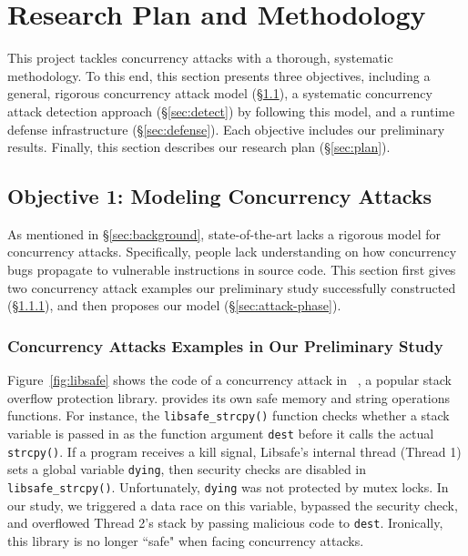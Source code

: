 \vspace{-.15in}\section{Research Plan and Methodology}
\label{sec:rep}\vspace{-.075in}

This \xxx project tackles concurrency attacks with a thorough, systematic 
methodology. To this end, this section presents three objectives, including a 
general, rigorous concurrency attack model (\S\ref{sec:model}), a systematic 
concurrency attack detection approach (\S\ref{sec:detect}) by following this 
model, and a runtime defense infrastructure (\S\ref{sec:defense}). Each 
objective includes our preliminary results. Finally, this section describes our 
research plan (\S\ref{sec:plan}).

\vspace{-.15in}\subsection{Objective 1: Modeling Concurrency Attacks} 
\label{sec:model}\vspace{-.075in}

As mentioned in \S\ref{sec:background}, state-of-the-art lacks a rigorous model 
for concurrency attacks. Specifically, people lack understanding on how 
concurrency bugs propagate to vulnerable instructions in source code. This 
section first gives two concurrency attack examples our preliminary study 
successfully constructed (\S\ref{sec:examples}), and then proposes 
our model (\S\ref{sec:attack-phase}).

\vspace{-.15in}\subsubsection{Concurrency Attacks Examples in Our Preliminary 
Study} 
\label{sec:examples}\vspace{-.075in}

Figure~\ref{fig:libsafe} shows the code of a concurrency attack in 
\libsafe~\cite{libsafe}, a popular stack overflow protection library. \libsafe
provides its own safe memory and string operations functions. For instance, the 
\texttt{libsafe\_strcpy()} function checks whether a stack variable is passed 
in as the function argument \texttt{dest} before it calls the actual 
\texttt{strcpy()}. If a program receives a kill signal, Libsafe's internal 
thread (Thread 1) sets a global variable \texttt{dying}, then security checks 
are disabled in \texttt{libsafe\_strcpy()}. Unfortunately, \texttt{dying} was 
not protected by mutex locks. In our study, we triggered a data race on this 
variable, bypassed the security check, and overflowed Thread 2's stack by 
passing malicious code to \texttt{dest}. Ironically, this \libsafe library is 
no longer ``safe" when facing concurrency attacks.


